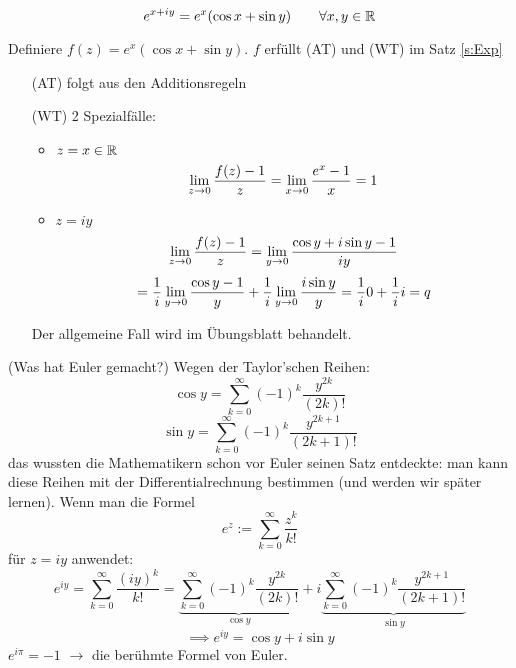 \begin{Sat}\label{s:Euler}
  \[e^{x+iy}=e^x(\cos x+\sin y) \qquad \forall x,y\in \mathbb{R}\]
\end{Sat}
\begin{Bew}
  Definiere $f(z)=e^x(\cos x+\sin y)$.
  $f$ erfüllt (AT) und (WT) im Satz \ref{s:Exp}%
  \begin{itemize}
    \item[(AT)] folgt aus den Additionsregeln
    \item[(WT)] 2 Spezialfälle:
      \begin{itemize}
        \item $z=x\in\mathbb{R}$
          \[\displaystyle\lim_{z\rightarrow0}\frac{f(z)-1}{z}=\displaystyle\lim_{x\rightarrow0}\frac{e^x-1}{x}=1\]
        \item $z=iy$
          \[\displaystyle\lim_{z\rightarrow0}\frac{f(z)-1}{z}=\displaystyle\lim_{y\rightarrow0}\frac{\cos y+i\sin y-1}{iy}\]
          \[=\frac{1}{i}\displaystyle\lim_{y\rightarrow0}\frac{\cos y-1}{y}+\frac{1}{i}\displaystyle\lim_{y\rightarrow0}\frac{i\sin y}{y}=\frac{1}{i}0+\frac{1}{i}i=q\]
      \end{itemize}
      Der allgemeine Fall wird im Übungsblatt behandelt.
  \end{itemize}
\end{Bew}
\begin{Bem}(Was hat Euler gemacht?) Wegen der Taylor'schen Reihen:
  \[\cos y=\sum_{k=0}^\infty(-1)^k\frac{y^{2k}}{(2k)!}\]
  \[\sin y=\sum_{k=0}^\infty(-1)^k\frac{y^{2k+1}}{(2k+1)!}\]
das wussten die Mathematikern schon vor Euler seinen Satz entdeckte:
man kann diese Reihen mit der Differentialrechnung bestimmen
(und werden wir sp\"ater lernen).
Wenn man die Formel
  \[e^z:=\sum^\infty_{k=0}\frac{z^k}{k!}\]
f\"ur $z=iy$ anwendet:
  \[e^{iy}=\sum^\infty_{k=0}\frac{(iy)^k}{k!}=\underbrace{\sum_{k=0}^\infty(-1)^k\frac{y^{2k}}{(2k)!}}_{\cos y}+i\underbrace{\sum_{k=0}^\infty(-1)^k\frac{y^{2k+1}}{(2k+1)!}}_{\sin y}\]
  \[\implies e^{iy}=\cos y+i\sin y\]
  $e^{i\pi}=-1$ $\to$ die berühmte Formel von Euler.
\end{Bem}
